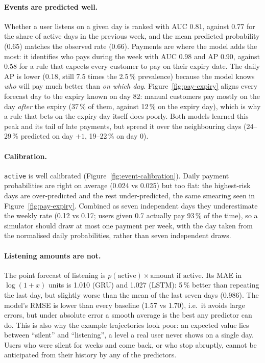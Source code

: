 \paragraph{Events are predicted well.}
Whether a user listens on a given day is ranked with AUC 0.81, against 0.77 for the share of active
days in the previous week, and the mean predicted probability (0.65) matches the observed rate (0.66).
Payments are where the model adds the most: it identifies who pays during the week with AUC 0.98 and
AP 0.90, against 0.58 for a rule that expects every customer to pay on their expiry date. The daily AP
is lower (0.18, still 7.5 times the 2.5\,\% prevalence) because the model knows \emph{who} will pay
much better than \emph{on which day}. Figure~\ref{fig:pay-expiry} aligns every forecast day to the
expiry known on day 82: manual customers pay mostly on the day \emph{after} the expiry (37\,\% of
them, against 12\,\% on the expiry day), which is why a rule that bets on the expiry day itself does
poorly. Both models learned this peak and its tail of late payments, but spread it over the
neighbouring days (24--29\,\% predicted on day $+1$, 19--22\,\% on day 0).

\paragraph{Calibration.}
\texttt{active} is well calibrated (Figure~\ref{fig:event-calibration}). Daily payment probabilities
are right on average (0.024 vs 0.025) but too flat: the highest-risk days are over-predicted and the
rest under-predicted, the same smearing seen in Figure~\ref{fig:pay-expiry}. Combined as seven
independent days they underestimate the weekly rate (0.12 vs 0.17; users given 0.7 actually pay
93\,\% of the time), so a simulator should draw at most one payment per week, with the day taken from
the normalised daily probabilities, rather than seven independent draws.

\paragraph{Listening amounts are not.}
The point forecast of listening is $p(\text{active}) \times \text{amount if active}$. Its MAE in
$\log(1+x)$ units is 1.010 (GRU) and 1.027 (LSTM): 5\,\% better than repeating the last day, but
slightly worse than the mean of the last seven days (0.986). The model's RMSE is lower than every
baseline (1.57 vs 1.70), i.e.\ it avoids large errors, but under absolute error a smooth average is
the best any predictor can do. This is also why the example trajectories look poor: an expected value
lies between ``silent'' and ``listening'', a level a real user never shows on a single day.
Users who were silent for weeks and come back, or who stop abruptly, cannot be anticipated from
their history by any of the predictors.

